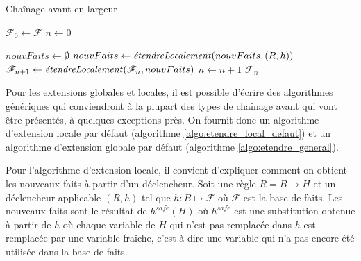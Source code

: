 \begin{algorithm}[H]\label{algo:chainage_avant_largeur}
\caption{Chaînage avant en largeur}
\SetAlgoLined
\DontPrintSemicolon


$\mathcal{F}_0 \gets \mathcal{F}$\;
$n \gets 0$\;

{
    $nouvFaits\gets \emptyset$ \;
    {
        {
            {
                $nouvFaits \leftarrow \mbox{\textit{étendreLocalement}}(nouvFaits, (R,h))$\;
            }
        }
    }
    $\mathcal{F}_{n+1} \gets \mbox{\textit{étendreLocalement}}(\mathcal{F}_{n}, nouvFaits)$\;
    $n \gets n + 1$\;
}
\Return $\mathcal{F}_n$
\end{algorithm}


Pour les extensions globales et locales, il est possible d'écrire des algorithmes génériques qui conviendront à la plupart des types de chaînage avant qui vont être présentés, à quelques exceptions près. On fournit donc un algorithme d'extension locale par défaut (algorithme \ref{algo:etendre_local_defaut}) et un algorithme d'extension globale par défaut (algorithme \ref{algo:etendre_general}).
\par Pour l'algorithme d'extension locale, il convient d'expliquer comment on obtient les nouveaux faits à partir d'un déclencheur. Soit une règle $R = B \rightarrow H$ et un déclencheur applicable $(R,h)$ tel que $h : B \mapsto \mathcal{F}$ où $\mathcal{F}$ est la base de faits. Les nouveaux faits sont le résultat de $h^{safe}(H)$ où $h^{safe}$ est une substitution obtenue à partir de $h$ où chaque variable de $H$ qui n'est pas remplacée dans $h$ est remplacée par une variable fraîche, c'est-à-dire une variable qui n'a pas encore été utilisée dans la base de faits.


